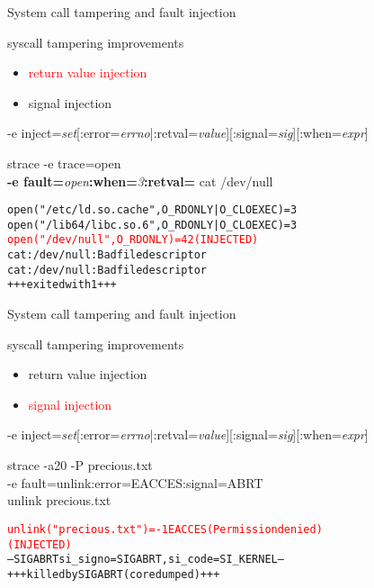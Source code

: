 \documentclass[unicode]{beamer}
\begin{document}
\begin{frame}[fragile]{System call tampering and fault injection}
\begin{block}{\large syscall tampering improvements}
\begin{itemize}
	\item \textcolor{red}{return value injection}
	\item signal injection
\end{itemize}
\end{block}
-e inject=\textit{set}[:error=\textit{errno}|:retval=\textit{value}][:signal=\textit{sig}][:when=\textit{expr}]
\begin{block}{\large strace -e trace=open \\ {\bf -e fault=}{\it open}{\bf :when=}{\it 3}{\bf :retval=}{}
cat /dev/null}
\begin{alltt}
open("/etc/ld.so.cache", O_RDONLY|O_CLOEXEC) = 3
open("/lib64/libc.so.6", O_RDONLY|O_CLOEXEC) = 3
\textcolor{red}{open("/dev/null", O_RDONLY)             = 42 (INJECTED)}
cat: /dev/null: Bad file descriptor
cat: /dev/null: Bad file descriptor
+++ exited with 1 +++
\end{alltt}
\end{block}
\end{frame}

\begin{frame}[fragile]{System call tampering and fault injection}
\begin{block}{\large syscall tampering improvements}
\begin{itemize}
	\item return value injection
	\item \textcolor{red}{signal injection}
\end{itemize}
\end{block}
-e inject=\textit{set}[:error=\textit{errno}|:retval=\textit{value}][:signal=\textit{sig}][:when=\textit{expr}]
\begin{block}{\large strace -a20 -P precious.txt \\ -e fault=unlink:error=EACCES:signal=ABRT \\ unlink precious.txt}
\begin{alltt}
\textcolor{red}{unlink("precious.txt") = -1 EACCES (Permission denied)
 (INJECTED)}
--- SIGABRT {si_signo=SIGABRT, si_code=SI_KERNEL} ---
+++ killed by SIGABRT (core dumped) +++
\end{alltt}
\end{block}
\end{frame}
\end{document}
